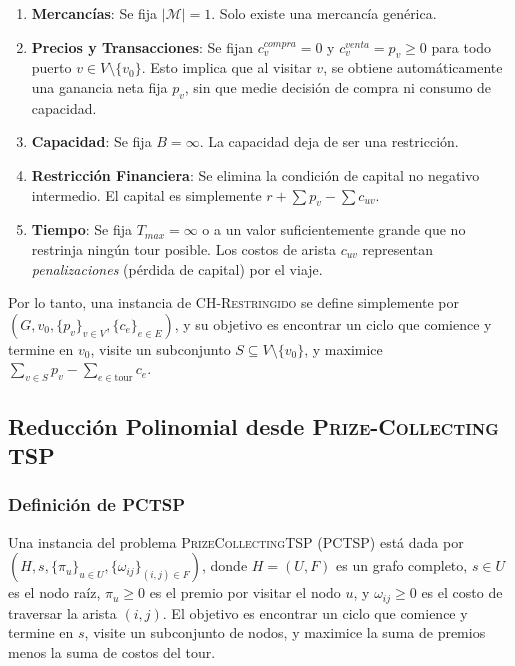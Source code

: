 \documentclass{article}
\begin{document}
\begin{enumerate} 
    \item \textbf{Mercancías}: Se fija $|\mathcal{M}| = 1$. Solo existe una mercancía genérica. 
    \item \textbf{Precios y Transacciones}: Se fijan $c^{compra}_{v} = 0$ y $c^{venta}_{v} = p_v \geq 0$ para todo puerto $v \in V \setminus \{v_0\}$. Esto implica que al visitar $v$, se obtiene automáticamente una ganancia neta fija $p_v$, sin que medie decisión de compra ni consumo de capacidad. 
    \item \textbf{Capacidad}: Se fija $B = \infty$. La capacidad deja de ser una restricción. 
    \item \textbf{Restricción Financiera}: Se elimina la condición de capital no negativo intermedio. El capital es simplemente $r + \sum p_v - \sum c_{uv}$. 
    \item \textbf{Tiempo}: Se fija $T_{max} = \infty$ o a un valor suficientemente grande que no restrinja ningún tour posible. Los costos de arista $c_{uv}$ representan \textit{penalizaciones} (pérdida de capital) por el viaje. 
\end{enumerate}

Por lo tanto, una instancia de \textsc{CH-Restringido} se define simplemente por $(G, v_0, \{p_v\}_{v \in V}, \{c_{e}\}_{e \in E})$, y su objetivo es encontrar un ciclo que comience y termine en $v_0$, visite un subconjunto $S \subseteq V \setminus \{v_0\}$, y maximice $\sum_{v \in S} p_v - \sum_{e \in \text{tour}} c_{e}$.

\subsection{Reducción Polinomial desde \textsc{Prize-Collecting TSP}}
\label{subsec:reduccion_pctsp}

\subsubsection*{Definición de PCTSP} 
Una instancia del problema \textsc{PrizeCollectingTSP} (PCTSP) está dada por $(H, s, \{\pi_u\}_{u \in U}, \{\omega_{ij}\}_{(i,j) \in F})$, donde $H=(U, F)$ es un grafo completo, $s \in U$ es el nodo raíz, $\pi_u \geq 0$ es el premio por visitar el nodo $u$, y $\omega_{ij} \geq 0$ es el costo de traversar la arista $(i,j)$. El objetivo es encontrar un ciclo que comience y termine en $s$, visite un subconjunto de nodos, y maximice la suma de premios menos la suma de costos del tour.
\end{document}
